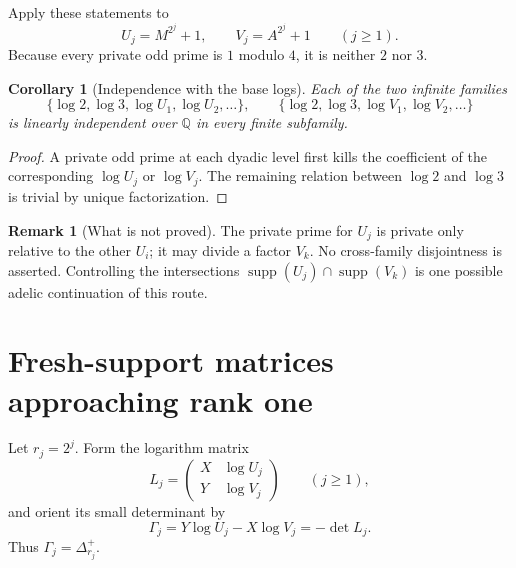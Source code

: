 \documentclass[11pt]{article}
\newtheorem{corollary}[theorem]{Corollary}
\theoremstyle{definition}
\newtheorem{remark}[theorem]{Remark}
\newcommand{\Q}{\mathbb Q}
\newcommand{\supp}{\operatorname{supp}}
\begin{document}
Apply these statements to
\begin{equation}\label{eq:UVj}
 U_j=M^{2^j}+1,
 \qquad V_j=A^{2^j}+1
 \qquad(j\ge1).
\end{equation}
Because every private odd prime is $1$ modulo $4$, it is neither $2$ nor $3$.

\begin{corollary}[Independence with the base logs]\label{cor:base-log-independence}
Each of the two infinite families
\begin{equation}\label{eq:independent-families}
 \{\log2,\log3,\log U_1,\log U_2,\ldots\},
 \qquad
 \{\log2,\log3,\log V_1,\log V_2,\ldots\}
\end{equation}
is linearly independent over $\Q$ in every finite subfamily.
\end{corollary}

\begin{proof}
A private odd prime at each dyadic level first kills the coefficient of the corresponding
$\log U_j$ or $\log V_j$.  The remaining relation between $\log2$ and $\log3$ is trivial
by unique factorization.
\end{proof}

\begin{remark}[What is not proved]
The private prime for $U_j$ is private only relative to the other $U_i$; it may divide a
factor $V_k$.  No cross-family disjointness is asserted.  Controlling the intersections
$\supp(U_j)\cap\supp(V_k)$ is one possible adelic continuation of this route.
\end{remark}

\section{Fresh-support matrices approaching rank one}
\label{sec:moving-matrices}

Let $r_j=2^j$.  Form the logarithm matrix
\begin{equation}\label{eq:Lj}
 L_j=
 \begin{pmatrix}
  X&\log U_j\\
  Y&\log V_j
 \end{pmatrix}
 \qquad(j\ge1),
\end{equation}
and orient its small determinant by
\begin{equation}\label{eq:Gammaj}
 \Gamma_j=Y\log U_j-X\log V_j=-\det L_j.
\end{equation}
Thus $\Gamma_j=\Delta_{r_j}^+$.
\end{document}
